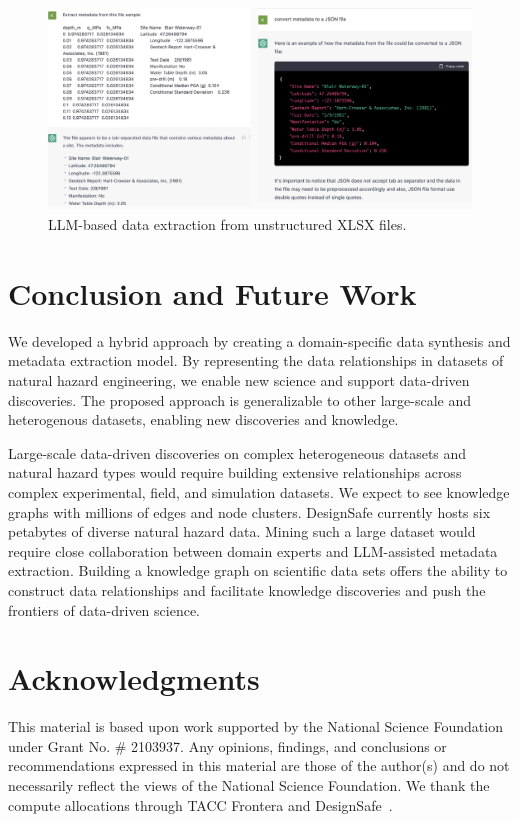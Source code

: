 \documentclass[acmsmall]{acmart}
\begin{document}
\begin{figure}
    \centering
    \includegraphics[width=0.95\linewidth]{figures/llm-xlsx.png}
    \caption{LLM-based data extraction from unstructured XLSX files.}
    \label{fig:llm-xlsx}
\end{figure}

\section{Conclusion and Future Work}
\label{sec:orgbe5d594}

We developed a hybrid approach by creating a domain-specific data synthesis and metadata extraction model.
By representing the data relationships in datasets of natural hazard engineering, we enable new science and support data-driven discoveries.
The proposed approach is generalizable to other large-scale and heterogenous datasets, enabling new discoveries and knowledge. 

Large-scale data-driven discoveries on complex heterogeneous datasets and natural hazard types would require building extensive relationships across complex experimental, field, and simulation datasets. 
We expect to see knowledge graphs with millions of edges and node clusters. 
DesignSafe currently hosts six petabytes of diverse natural hazard data.
Mining such a large dataset would require close collaboration between domain experts and LLM-assisted metadata extraction. 
Building a knowledge graph on scientific data sets offers the ability to construct data relationships and facilitate knowledge discoveries and push the frontiers of data-driven science. 

\section{Acknowledgments}
\label{sec:orgcd20bd8}
This material is based upon work supported by the National Science Foundation under Grant No. \# 2103937.
Any opinions, findings, and conclusions or recommendations expressed in this material are those of the author(s) and do not necessarily reflect the views of the National Science Foundation. We thank the compute allocations through TACC Frontera and DesignSafe~\cite{designsafe}.



\end{document}
